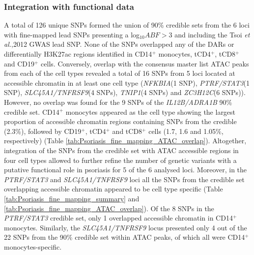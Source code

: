 \subsubsection{Integration with functional data}
A total of 126 unique SNPs formed the union of 90\% credible sets from the 6 loci with fine-mapped lead SNPs presenting a log$_{10}ABF>$3 and including the Tsoi \textit{et al.},2012 GWAS lead SNP. None of the SNPs overlapped any of the DARs or differentially H3K27ac regions identified in CD14$^+$ monocytes, tCD4$^+$, tCD8$^+$ and CD19$^+$ cells. Conversely, overlap with the consensus master list ATAC peaks from each of the cell types revealed a total of 16 SNPs from 5 loci located at accessible chromatin in at least one cell type (\textit{NFKBIA}(1 SNP), \textit{PTRF/STAT3}(1 SNP), \textit{SLC45A1/TNFRSF9}(4 SNPs), \textit{TNIP1}(4 SNPs) and \textit{ZC3H12C}(6 SNPs)). However, no overlap was found for the 9 SNPs of the \textit{IL12B/ADRA1B} 90\% credible set. CD14$^+$ monocytes appeared as the cell type showing the largest proportion of accessible chromatin regions containing SNPs from the credible (2.3\%), followed by CD19$^+$, tCD4$^+$ and tCD8$^+$ cells (1.7, 1.6 and 1.05\%, respectively) (Table \ref{tab:Psoriasis_fine_mapping_ATAC_overlap}). Altogether, integration of the SNPs from the credible set with ATAC accessible regions in four cell types allowed to further refine the number of genetic variants with a putative functional role in psoriasis for 5 of the 6 analysed loci. Moreover, in the \textit{PTRF/STAT3} and \textit{SLC45A1/TNFRSF9} loci all the SNPs from the credible set overlapping accessible chromatin appeared to be cell type specific (Table \ref{tab:Psoriasis_fine_mapping_summary} and \ref{tab:Psoriasis_fine_mapping_ATAC_overlap}). Of the 8 SNPs in the \textit{PTRF/STAT3} credible set, only 1 overlapped accessible chromatin in CD14$^+$ monocytes. Similarly, the \textit{SLC45A1/TNFRSF9} locus presented only 4 out of the 22 SNPs from the 90\% credible set within ATAC peaks, of which all were CD14$^+$ monocytes-specific.   


